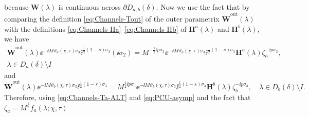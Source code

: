 because $\mathbf{W}(\lambda)$ is continuous across $\partial D_{a,b}(\delta)$.  Now we use the fact that by comparing the definition \eqref{eq:Channels-Tout} of the outer parametrix 
$\dot{\mathbf{W}}^\mathrm{out}(\lambda)$ with the definitions \eqref{eq:Channels-Ha}--\eqref{eq:Channels-Hb} of $\mathbf{H}^a(\lambda)$ and $\mathbf{H}^b(\lambda)$, we have
\begin{multline}
\dot{\mathbf{W}}^\mathrm{out}(\lambda)\ee^{-\ii M\vartheta_a(\chi,\tau)\sigma_3}\ii^{\frac{1}{2}(1-s)\sigma_3}(\ii\sigma_2)
=M^{-\frac{1}{2}\ii p\sigma_3}\ee^{-\ii M\vartheta_a(\chi,\tau)\sigma_3}\ii^{\frac{1}{2}(1-s)\sigma_3}\mathbf{H}^a(\lambda)\zeta_a^{-\ii p\sigma_3},\\
\lambda\in D_a(\delta)\setminus I
\end{multline}
and
\begin{equation}
\dot{\mathbf{W}}^\mathrm{out}(\lambda)\ee^{-\ii M\vartheta_b(\chi,\tau)\sigma_3}\ii^{\frac{1}{2}(1-s)\sigma_3}
=M^{\frac{1}{2}\ii p\sigma_3}\ee^{-\ii M\vartheta_b(\chi,\tau)\sigma_3}\ii^{\frac{1}{2}(1-s)\sigma_3}\mathbf{H}^b(\lambda)\zeta_b^{-\ii p\sigma_3},\quad
\lambda\in D_b(\delta)\setminus I.
\end{equation}
Therefore, using \eqref{eq:Channels-Ta-ALT} and \eqref{eq:PCU-asymp} and the fact that 
$\zeta_a=M^\frac{1}{2}f_a(\lambda;\chi,\tau)$
